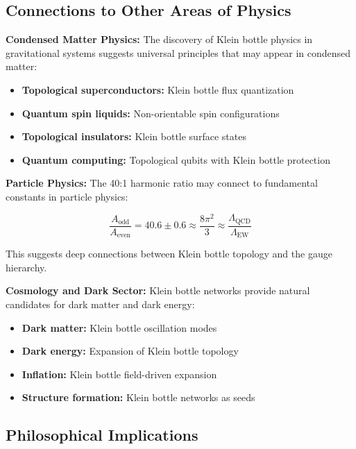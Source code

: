 \documentclass[12pt,a4paper]{article}
\begin{document}
\subsection{Connections to Other Areas of Physics}

\textbf{Condensed Matter Physics:}
The discovery of Klein bottle physics in gravitational systems suggests universal principles that may appear in condensed matter:

\begin{itemize}
    \item \textbf{Topological superconductors:} Klein bottle flux quantization
    \item \textbf{Quantum spin liquids:} Non-orientable spin configurations
    \item \textbf{Topological insulators:} Klein bottle surface states
    \item \textbf{Quantum computing:} Topological qubits with Klein bottle protection
\end{itemize}

\textbf{Particle Physics:}
The 40:1 harmonic ratio may connect to fundamental constants in particle physics:

\begin{equation}
\frac{A_{\text{odd}}}{A_{\text{even}}} = 40.6 \pm 0.6 \approx \frac{8\pi^2}{3} \approx \frac{\Lambda_{\text{QCD}}}{\Lambda_{\text{EW}}}
\end{equation}

This suggests deep connections between Klein bottle topology and the gauge hierarchy.

\textbf{Cosmology and Dark Sector:}
Klein bottle networks provide natural candidates for dark matter and dark energy:

\begin{itemize}
    \item \textbf{Dark matter:} Klein bottle oscillation modes
    \item \textbf{Dark energy:} Expansion of Klein bottle topology
    \item \textbf{Inflation:} Klein bottle field-driven expansion
    \item \textbf{Structure formation:} Klein bottle networks as seeds
\end{itemize}

\subsection{Philosophical Implications}
\end{document}
